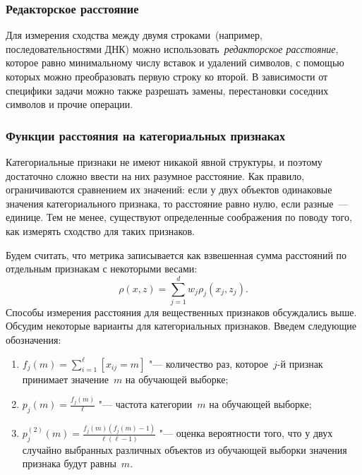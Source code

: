 \documentclass[12pt,fleqn]{article}
\begin{document}

        \subsubsection{Редакторское расстояние}
        Для измерения сходства между двумя строками~(например, последовательностями ДНК) можно
        использовать~\emph{редакторское расстояние},
        которое равно минимальному числу вставок и удалений символов, с помощью
        которых можно преобразовать первую строку ко второй.
        В зависимости от специфики задачи можно также разрешать замены,
        перестановки соседних символов и прочие операции.



        \subsubsection{Функции расстояния на категориальных признаках}
        Категориальные признаки не имеют никакой явной структуры,
        и поэтому достаточно сложно ввести на них разумное расстояние.
        Как правило, ограничиваются сравнением их значений:
        если у двух объектов одинаковые значения категориального признака,
        то расстояние равно нулю, если разные~--- единице.
        Тем не менее, существуют определенные соображения по поводу того,
        как измерять сходство для таких признаков.

        Будем считать, что метрика записывается как взвешенная сумма расстояний по отдельным признакам с некоторыми весами:
        \[
            \rho(x, z)
            =
            \sum_{j = 1}^{d}
                w_j \rho_j(x_j, z_j).
        \]
        Способы измерения расстояния для вещественных признаков обсуждались выше.
        Обсудим некоторые варианты для категориальных признаков.
        Введем следующие обозначения:
        \begin{enumerate}
        	\item $f_j(m) = \sum_{i=1}^\ell [x_{ij} = m]$ "--- количество раз, которое~$j$-й признак принимает значение~$m$ на обучающей выборке;
        	\item $p_j(m) = \frac{f_j(m)}{\ell}$ "--- частота категории~$m$ на обучающей выборке;
        	\item $p_j^{(2)}(m) = \frac{f_j(m) (f_j(m) - 1)}{\ell (\ell - 1)}$ "--- оценка вероятности того, что у двух случайно выбранных различных объектов из обучающей выборки значения признака будут равны~$m$.
        \end{enumerate}
        
\end{document}
